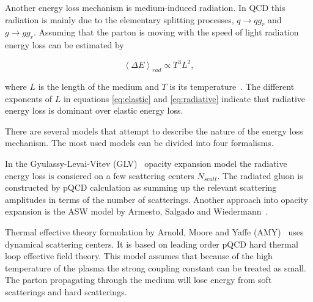 Another energy loss mechanism is medium-induced radiation. In QCD this radiation is mainly due to the elementary splitting processes, $q\rightarrow qg_r$ and $g\rightarrow gg_r$. Assuming that the parton is moving with the speed of light radiation energy loss can be estimated by

\begin{equation}
\left<\Delta E\right>_{rad}\propto T^3L^2,
\label{eq:radiative}
\end{equation}

\noindent where $L$ is the length of the medium and $T$ is its temperature~\cite{Dominguez:2008vd}. The different exponents of $L$ in equations \ref{eq:elastic} and \ref{eq:radiative} indicate that radiative energy loss is dominant over elastic energy loss.


There are several models that attempt to describe the nature of the energy loss mechanism. The most used models can be divided into four formalisms.
%

In the Gyulassy-Levai-Vitev (GLV)~\cite{Gyulassy:1999zd} opacity expansion model
 the radiative energy loss is consiered on a few scattering centers $N_{scatt}$. The radiated gluon is constructed by pQCD calculation as summing up the relevant scattering amplitudes in terms of the number of scatterings. Another approach into opacity expansion is the ASW model by Armesto, Salgado and Wiedermann~\cite{Wiedemann:2000za}.

Thermal effective theory formulation by Arnold, Moore and Yaffe (AMY)~\cite{Arnold:2001ms} uses dynamical scattering centers. It is based on leading order pQCD hard thermal loop effective field theory. This model assumes that because of the high temperature of the plasma the strong coupling constant can be treated as small. The parton propagating through the medium will lose energy from soft scatterings and hard scatterings.

